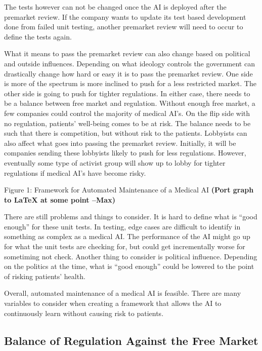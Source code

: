\documentclass[]{article}
\begin{document}
			The tests however can not be changed once the AI is deployed after the premarket review. If the company wants to update its test based development done from failed unit testing, another premarket review will need to occur to define the tests again.

			What it means to pass the premarket review can also change based on political and outside influences. Depending on what ideology controls the government can drastically change how hard or easy it is to pass the premarket review. One side is more of the spectrum is more inclined to push for a less restricted market. The other side is going to push for tighter regulations. In either case, there needs to be a balance between free market and regulation. Without enough free market, a few companies could control the majority of medical AI’s. On the flip side with no regulation, patients’ well-being comes to be at risk. The balance needs to be such that there is competition, but without risk to the patients. Lobbyists can also affect what goes into passing the premarket review. Initially, it will be companies sending these lobbyists likely to push for less regulations. However, eventually some type of activist group will show up to lobby for tighter regulations if medical AI’s have become risky.

			Figure 1: Framework for Automated Maintenance of a Medical AI \textbf{(Port graph to LaTeX at some point --Max)}

			There are still problems and things to consider. It is hard to define what is “good enough” for these unit tests. In testing, edge cases are difficult to identify in something as complex as a medical AI. The performance of the AI might go up for what the unit tests are checking for, but could get incrementally worse for sometiming not check. Another thing to consider is political influence. Depending on the politics at the time, what is “good enough” could be lowered to the point of risking patients’ health.
		
			Overall, automated maintenance of a medical AI is feasible. There are many variables to consider when creating a framework that allows the AI to continuously learn without causing risk to patients. 

		\subsection{Balance of Regulation Against the Free Market}\label{market}

			
\medskip



		
\end{document}
